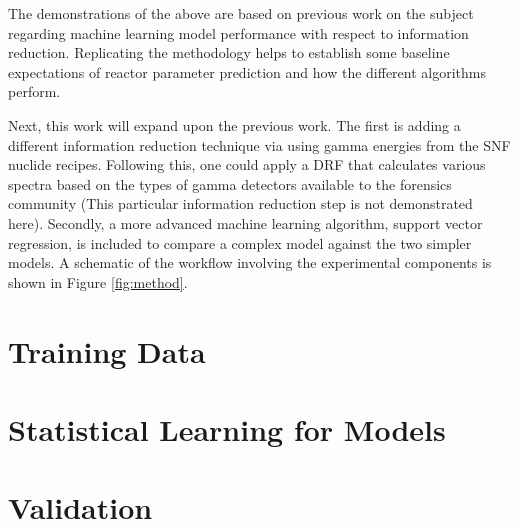 The demonstrations of the above are based on previous work on the subject
\cite{dayman_feasibility_2013} regarding machine learning model performance
with respect to information reduction.  Replicating the methodology helps to
establish some baseline expectations of reactor parameter prediction and how
the different algorithms perform. 

Next, this work will expand upon the previous work.  The first is adding a
different information reduction technique via using gamma energies from the
\gls{SNF} nuclide recipes.  Following this, one could apply a \gls{DRF} that
calculates various spectra based on the types of gamma detectors available to
the forensics community (This particular information reduction step is not
demonstrated here).  Secondly, a more advanced machine learning algorithm,
support vector regression, is included to compare a complex model against the
two simpler models.  A schematic of the workflow involving the experimental
components is shown in Figure \ref{fig:method}.

\section{Training Data}
\label{sec:training}


\section{Statistical Learning for Models}
\label{sec:statmodel}


\section{Validation}
\label{sec:valid}

